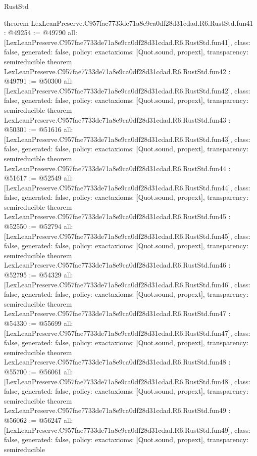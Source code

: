 \begin{lexlean}{RustStd}
\begin{coremodule}
{}
theorem LexLeanPreserve.C957fae7733de71a8e9ca0df28d31cdad.R6.RustStd.fun41 : @49254 := @49790 {
  all: [LexLeanPreserve.C957fae7733de71a8e9ca0df28d31cdad.R6.RustStd.fun41],
  class: false,
  generated: false,
  policy: exact{axioms: [Quot.sound, propext]},
  transparency: semireducible
}
theorem LexLeanPreserve.C957fae7733de71a8e9ca0df28d31cdad.R6.RustStd.fun42 : @49791 := @50300 {
  all: [LexLeanPreserve.C957fae7733de71a8e9ca0df28d31cdad.R6.RustStd.fun42],
  class: false,
  generated: false,
  policy: exact{axioms: [Quot.sound, propext]},
  transparency: semireducible
}
theorem LexLeanPreserve.C957fae7733de71a8e9ca0df28d31cdad.R6.RustStd.fun43 : @50301 := @51616 {
  all: [LexLeanPreserve.C957fae7733de71a8e9ca0df28d31cdad.R6.RustStd.fun43],
  class: false,
  generated: false,
  policy: exact{axioms: [Quot.sound, propext]},
  transparency: semireducible
}
theorem LexLeanPreserve.C957fae7733de71a8e9ca0df28d31cdad.R6.RustStd.fun44 : @51617 := @52549 {
  all: [LexLeanPreserve.C957fae7733de71a8e9ca0df28d31cdad.R6.RustStd.fun44],
  class: false,
  generated: false,
  policy: exact{axioms: [Quot.sound, propext]},
  transparency: semireducible
}
theorem LexLeanPreserve.C957fae7733de71a8e9ca0df28d31cdad.R6.RustStd.fun45 : @52550 := @52794 {
  all: [LexLeanPreserve.C957fae7733de71a8e9ca0df28d31cdad.R6.RustStd.fun45],
  class: false,
  generated: false,
  policy: exact{axioms: [Quot.sound, propext]},
  transparency: semireducible
}
theorem LexLeanPreserve.C957fae7733de71a8e9ca0df28d31cdad.R6.RustStd.fun46 : @52795 := @54329 {
  all: [LexLeanPreserve.C957fae7733de71a8e9ca0df28d31cdad.R6.RustStd.fun46],
  class: false,
  generated: false,
  policy: exact{axioms: [Quot.sound, propext]},
  transparency: semireducible
}
theorem LexLeanPreserve.C957fae7733de71a8e9ca0df28d31cdad.R6.RustStd.fun47 : @54330 := @55699 {
  all: [LexLeanPreserve.C957fae7733de71a8e9ca0df28d31cdad.R6.RustStd.fun47],
  class: false,
  generated: false,
  policy: exact{axioms: [Quot.sound, propext]},
  transparency: semireducible
}
theorem LexLeanPreserve.C957fae7733de71a8e9ca0df28d31cdad.R6.RustStd.fun48 : @55700 := @56061 {
  all: [LexLeanPreserve.C957fae7733de71a8e9ca0df28d31cdad.R6.RustStd.fun48],
  class: false,
  generated: false,
  policy: exact{axioms: [Quot.sound, propext]},
  transparency: semireducible
}
theorem LexLeanPreserve.C957fae7733de71a8e9ca0df28d31cdad.R6.RustStd.fun49 : @56062 := @56247 {
  all: [LexLeanPreserve.C957fae7733de71a8e9ca0df28d31cdad.R6.RustStd.fun49],
  class: false,
  generated: false,
  policy: exact{axioms: [Quot.sound, propext]},
  transparency: semireducible
}
\end{coremodule}
\end{lexlean}
